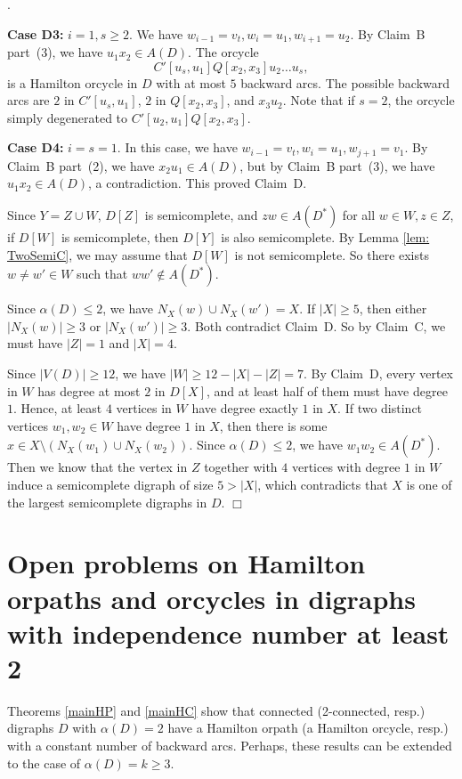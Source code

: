 \documentclass{article}
\newcommand{\2}{\vspace{2mm}}
\renewenvironment{proof}[1][]{\par \noindent {\bf Proof#1}.\ }{\hfill$\Box$
\par \vspace{11pt}}
\theoremstyle{definition}
\begin{document}
\begin{proof}
\2

\textbf{Case D3:} $i=1, s\ge 2$. We have $w_{i-1}=v_t, w_i=u_1, w_{i+1}=u_2$. By Claim~B part~(3), we have $u_1x_2 \in A(D)$. The orcycle 
\[
C'[u_s,u_1]Q[x_2,x_3]u_2 \dots u_s,
\]
is a Hamilton orcycle in $D$ with at most $5$ backward arcs.
The possible backward arcs are $2$ in $C'[u_s,u_1]$, $2$ in $Q[x_2,x_3]$, and $x_3u_2$. Note that if $s=2$, the orcycle simply degenerated to $C'[u_2,u_1]Q[x_2,x_3]$.

\2

\textbf{Case D4:} $i=s=1$. In this case, we have $w_{i-1}=v_t, w_i=u_1, w_{j+1}=v_1$. By Claim~B part~(2), we have $x_2u_1 \in A(D)$, but by Claim~B part~(3), we have $u_1x_2 \in A(D)$, a contradiction.
This proved Claim~D.

\2

Since $Y=Z \cup W$, $D[Z]$ is semicomplete, and $zw \in A(D^*)$ for all $w \in W, z \in Z$, if $D[W]$ is semicomplete, then $D[Y]$ is also semicomplete.
By Lemma \ref{lem: TwoSemiC}, we may assume that $D[W]$ is not semicomplete. So there exists $w \neq w' \in W$ such that $ww' \notin A(D^*)$. 

Since $\alpha(D) \le 2$, we have $N_X(w)\cup N_X(w')=X$. If $|X| \ge 5$, then either $|N_X(w)|\ge 3$ or $|N_X(w')|\ge 3$. Both contradict Claim~D. So by Claim~C, we must have $|Z|=1$ and $|X|=4$. 


Since $|V(D)| \ge 12$, we have $|W| \ge 12-|X|-|Z| =7$. By Claim~D, every vertex in $W$ has degree at most $2$ in $D[X]$, and at least half of them must have degree $1$. Hence, at least $4$ vertices in $W$ have degree exactly $1$ in $X$. If two distinct vertices $w_1,w_2 \in W$ have degree $1$ in $X$, then there is some $x \in X \setminus (N_X(w_1) \cup N_X(w_2))$. Since $\alpha(D) \le 2$, we have $w_1w_2 \in A(D^*)$. 
Then we know that the vertex in $Z$ together with $4$ vertices with degree $1$ in $W$  induce a semicomplete digraph of size $5 > |X|$, which contradicts that $X$ is one of the largest semicomplete digraphs in $D$.
\end{proof}




\section{Open problems on Hamilton orpaths and orcycles in digraphs with independence number at least 2}\label{sec:OP}

Theorems \ref{mainHP} and \ref{mainHC} show that connected (2-connected, resp.) digraphs $D$ with $\alpha(D)=2$ have a Hamilton orpath (a Hamilton orcycle, resp.) with a constant number of backward arcs. Perhaps, these results can be extended to the case of $\alpha(D)=k\ge 3$. 
\end{document}
